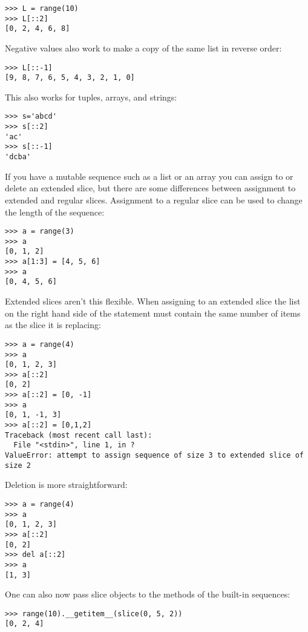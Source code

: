 \documentclass{howto}
\begin{document}
\begin{verbatim}
>>> L = range(10)
>>> L[::2]
[0, 2, 4, 6, 8]
\end{verbatim}

Negative values also work to make a copy of the same list in reverse
order:

\begin{verbatim}
>>> L[::-1]
[9, 8, 7, 6, 5, 4, 3, 2, 1, 0]
\end{verbatim}

This also works for tuples, arrays, and strings:

\begin{verbatim}
>>> s='abcd'
>>> s[::2]
'ac'
>>> s[::-1]
'dcba'
\end{verbatim}

If you have a mutable sequence such as a list or an array you can
assign to or delete an extended slice, but there are some differences
between assignment to extended and regular slices.  Assignment to a
regular slice can be used to change the length of the sequence:

\begin{verbatim}
>>> a = range(3)
>>> a
[0, 1, 2]
>>> a[1:3] = [4, 5, 6]
>>> a
[0, 4, 5, 6]
\end{verbatim}

Extended slices aren't this flexible.  When assigning to an extended
slice the list on the right hand side of the statement must contain
the same number of items as the slice it is replacing:

\begin{verbatim}
>>> a = range(4)
>>> a
[0, 1, 2, 3]
>>> a[::2]
[0, 2]
>>> a[::2] = [0, -1]
>>> a
[0, 1, -1, 3]
>>> a[::2] = [0,1,2]
Traceback (most recent call last):
  File "<stdin>", line 1, in ?
ValueError: attempt to assign sequence of size 3 to extended slice of size 2
\end{verbatim}

Deletion is more straightforward:

\begin{verbatim}
>>> a = range(4)
>>> a
[0, 1, 2, 3]
>>> a[::2]
[0, 2]
>>> del a[::2]
>>> a
[1, 3]
\end{verbatim}

One can also now pass slice objects to the
 methods of the built-in sequences:

\begin{verbatim}
>>> range(10).__getitem__(slice(0, 5, 2))
[0, 2, 4]
\end{verbatim}
\end{document}

